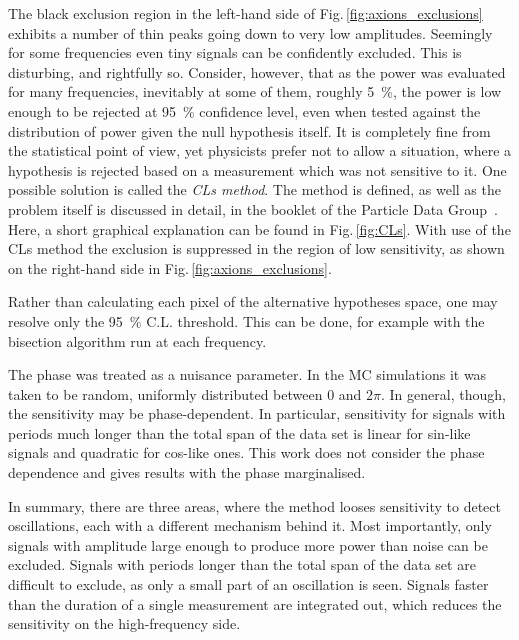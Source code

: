 The black exclusion region in the left-hand side of Fig.\,\ref{fig:axions_exclusions} exhibits a number of thin peaks going down to very low amplitudes. Seemingly for some frequencies even tiny signals can be confidently excluded. This is disturbing, and rightfully so.
Consider, however, that as the power was evaluated for many frequencies, inevitably at some of them, roughly \SI{5}{\percent}, the power is low enough to be rejected at \SI{95}{\percent} confidence level, even when tested against the distribution of power given the null hypothesis itself.
It is completely fine from the statistical point of view, yet physicists prefer not to allow a situation, where a hypothesis is rejected based on a measurement which was not sensitive to it.
One possible solution is called the \emph{CLs method}. The method is defined, as well as the problem itself is discussed in detail, in the booklet of the Particle Data Group~\cite{PDG2016}. Here, a short graphical explanation can be found in Fig.\,\ref{fig:CLs}. With use of the CLs method the exclusion is suppressed in the region of low sensitivity, as shown on the right-hand side in Fig.\,\ref{fig:axions_exclusions}.

Rather than calculating each pixel of the alternative hypotheses space, one may resolve only the \SI{95}{\percent} C.L. threshold. This can be done, for example with the bisection algorithm run at each frequency.

The phase was treated as a nuisance parameter. In the MC simulations it was taken to be random, uniformly distributed between $0$ and $2\pi$. In general, though, the sensitivity may be phase-dependent. In particular, sensitivity for signals with periods much longer than the total span of the data set is linear for sin-like signals and quadratic for cos-like ones. This work does not consider the phase dependence and gives results with the phase marginalised.

In summary, there are three areas, where the method looses sensitivity to detect oscillations, each with a different mechanism behind it. Most importantly, only signals with amplitude large enough to produce more power than noise can be excluded. Signals with periods longer than the total span of the data set are difficult to exclude, as only a small part of an oscillation is seen. Signals faster than the duration of a single measurement are integrated out, which reduces the sensitivity on the high-frequency side.




